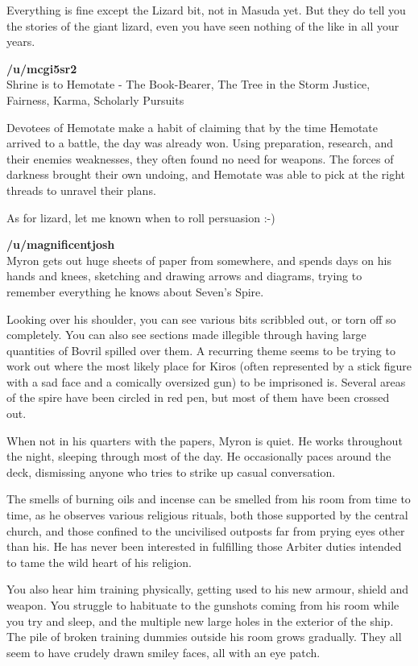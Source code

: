 Everything is fine except the Lizard bit, not in Masuda yet. But they do tell you the stories of the giant lizard, even you have seen nothing of the like in all your years.\medskip

\textbf{/u/mcgi5sr2}\\
Shrine is to Hemotate - The Book-Bearer, The Tree in the Storm Justice, Fairness, Karma, Scholarly Pursuits\medskip

Devotees of Hemotate make a habit of claiming that by the time Hemotate arrived to a battle, the day was already won. Using preparation, research, and their enemies weaknesses, they often found no need for weapons. The forces of darkness brought their own undoing, and Hemotate was able to pick at the right threads to unravel their plans.\medskip

As for lizard, let me known when to roll persuasion :-)\medskip

\textbf{/u/magnificentjosh}\\
Myron gets out huge sheets of paper from somewhere, and spends days on his hands and knees, sketching and drawing arrows and diagrams, trying to remember everything he knows about Seven's Spire.\medskip

Looking over his shoulder, you can see various bits scribbled out, or torn off so completely. You can also see sections made illegible through having large quantities of Bovril spilled over them. A recurring theme seems to be trying to work out where the most likely place for Kiros (often represented by a stick figure with a sad face and a comically oversized gun) to be imprisoned is. Several areas of the spire have been circled in red pen, but most of them have been crossed out.\medskip

When not in his quarters with the papers, Myron is quiet. He works throughout the night, sleeping through most of the day. He occasionally paces around the deck, dismissing anyone who tries to strike up casual conversation.\medskip

The smells of burning oils and incense can be smelled from his room from time to time, as he observes various religious rituals, both those supported by the central church, and those confined to the uncivilised outposts far from prying eyes other than his. He has never been interested in fulfilling those Arbiter duties intended to tame the wild heart of his religion.\medskip

You also hear him training physically, getting used to his new armour, shield and weapon. You struggle to habituate to the gunshots coming from his room while you try and sleep, and the multiple new large holes in the exterior of the ship. The pile of broken training dummies outside his room grows gradually. They all seem to have crudely drawn smiley faces, all with an eye patch.\medskip

